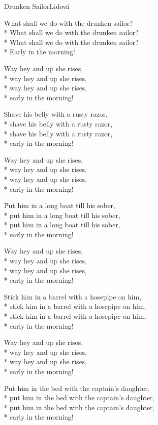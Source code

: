 \documentclass[10.5pt]{book}
\begin{document}
\begin{poem}{Drunken Sailor}{Lidová}

\settowidth{\versewidth}{Put him in the bed with the captains daughter,}

What shall we do with the drunken sailor?\\*
What shall we do with the drunken sailor?\\*
What shall we do with the drunken sailor?\\*
Early in the morning!

Way hey and up she rises,\\*
way hey and up she rises,\\*
way hey and up she rises,\\*
early in the morning!

Shave his belly with a rusty razor,\\*
shave his belly with a rusty razor,\\*
shave his belly with a rusty razor,\\*
early in the morning!

Way hey and up she rises,\\*
way hey and up she rises,\\*
way hey and up she rises,\\*
early in the morning!

Put him in a long boat till his sober,\\*
put him in a long boat till his sober,\\*
put him in a long boat till his sober,\\*
early in the morning!

Way hey and up she rises,\\*
way hey and up she rises,\\*
way hey and up she rises,\\*
early in the morning!

Stick him in a barrel with a hosepipe on him,\\*
stick him in a barrel with a hosepipe on him,\\*
stick him in a barrel with a hosepipe on him,\\*
early in the morning!

Way hey and up she rises,\\*
way hey and up she rises,\\*
way hey and up she rises,\\*
early in the morning!

Put him in the bed with the captain's daughter,\\*
put him in the bed with the captain's daughter,\\*
put him in the bed with the captain's daughter,\\*
early in the morning!


\end{poem}
\end{document}
